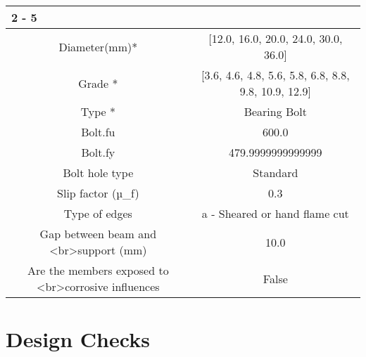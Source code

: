 \documentclass{article}%
\begin{document}
\begin{longtable}{|p{5cm}|p{2cm}|p{2cm}|p{2cm}|p{5cm}|}
\cline{2%
-%
5}%
\hline%
\multicolumn{5}{|c|}{\textbf{Bolt Details}}\\%
\hline%
\hline%
\multicolumn{3}{|c|}{Diameter(mm)*}&\multicolumn{2}{|c|}{{[}12.0, 16.0, 20.0, 24.0, 30.0, 36.0{]}}\\%
\hline%
\hline%
\multicolumn{3}{|c|}{Grade *}&\multicolumn{2}{|c|}{{[}3.6, 4.6, 4.8, 5.6, 5.8, 6.8, 8.8, 9.8, 10.9, 12.9{]}}\\%
\hline%
\hline%
\multicolumn{3}{|c|}{Type *}&\multicolumn{2}{|c|}{Bearing Bolt}\\%
\hline%
\hline%
\multicolumn{3}{|c|}{Bolt.fu}&\multicolumn{2}{|c|}{600.0}\\%
\hline%
\hline%
\multicolumn{3}{|c|}{Bolt.fy}&\multicolumn{2}{|c|}{479.9999999999999}\\%
\hline%
\hline%
\multicolumn{3}{|c|}{Bolt hole type}&\multicolumn{2}{|c|}{Standard}\\%
\hline%
\hline%
\multicolumn{3}{|c|}{Slip factor (µ\_f)}&\multicolumn{2}{|c|}{0.3}\\%
\hline%
\hline%
\multicolumn{3}{|c|}{Type of edges}&\multicolumn{2}{|c|}{a {-} Sheared or hand flame cut}\\%
\hline%
\hline%
\multicolumn{3}{|c|}{Gap between beam and <br>support (mm)}&\multicolumn{2}{|c|}{10.0}\\%
\hline%
\hline%
\multicolumn{3}{|c|}{Are the members exposed to <br>corrosive influences}&\multicolumn{2}{|c|}{False}\\%
\hline%
\end{longtable}

%
%
\section{Design Checks}%
\label{sec:DesignChecks}%
\end{document}
